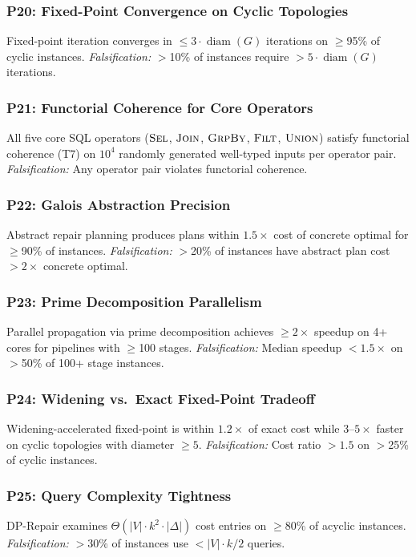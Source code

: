 \documentclass[11pt,a4paper]{article}
\theoremstyle{definition}
\DeclareMathOperator{\diam}{diam}
\begin{document}
\subsubsection{P20: Fixed-Point Convergence on Cyclic Topologies}
Fixed-point iteration converges in $\leq 3 \cdot \diam(G)$ iterations on
$\geq$95\% of cyclic instances.
\emph{Falsification:} $>$10\% of instances require $>5 \cdot \diam(G)$
iterations.

\subsubsection{P21: Functorial Coherence for Core Operators}
All five core SQL operators ($\textsc{Sel}$, $\textsc{Join}$, $\textsc{GrpBy}$,
$\textsc{Filt}$, $\textsc{Union}$) satisfy functorial coherence (T7) on
$10^4$ randomly generated well-typed inputs per operator pair.
\emph{Falsification:} Any operator pair violates functorial coherence.

\subsubsection{P22: Galois Abstraction Precision}
Abstract repair planning produces plans within $1.5\times$ cost of concrete
optimal for $\geq$90\% of instances.
\emph{Falsification:} $>$20\% of instances have abstract plan cost $>2\times$
concrete optimal.

\subsubsection{P23: Prime Decomposition Parallelism}
Parallel propagation via prime decomposition achieves $\geq 2\times$ speedup
on 4+ cores for pipelines with $\geq$100 stages.
\emph{Falsification:} Median speedup $<1.5\times$ on $>$50\% of 100+ stage
instances.

\subsubsection{P24: Widening vs.\ Exact Fixed-Point Tradeoff}
Widening-accelerated fixed-point is within $1.2\times$ of exact cost while
$3$--$5\times$ faster on cyclic topologies with diameter $\geq 5$.
\emph{Falsification:} Cost ratio $>1.5$ on $>$25\% of cyclic instances.

\subsubsection{P25: Query Complexity Tightness}
DP-Repair examines $\Theta(|V| \cdot k^2 \cdot |\Delta|)$ cost entries on
$\geq$80\% of acyclic instances.
\emph{Falsification:} $>$30\% of instances use $<|V| \cdot k / 2$ queries.
\end{document}
